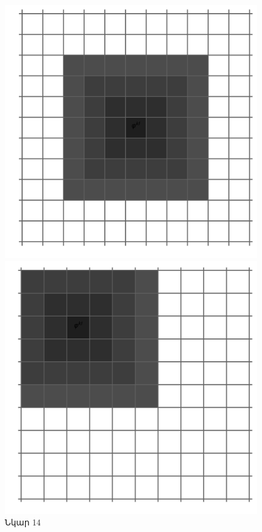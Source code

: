 \documentclass[fleqn, bachelor,subf,12pt,notitlepage]{article}
\begin{document}
\begin{figure}[h!]
  \centering
  \begin{minipage}[b]{0.2\textwidth}
    \includegraphics[width=\textwidth]{images/two_dimensional_basis_intersection}
    \caption{Նկար 14}
  \end{minipage}
  \hfill
  \begin{minipage}[b]{0.2\textwidth}
    \includegraphics[width=\textwidth]{images/two_dimensional_basis_intersection_edge_1}

\end{minipage}
\end{figure}
\end{document}
